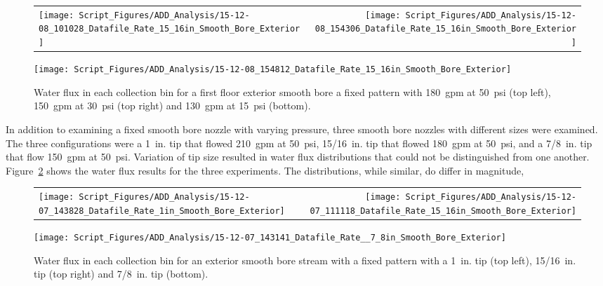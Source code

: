 \documentclass[12pt,oneside]{book}
\begin{document}
\begin{figure}[ht]
\begin{tabular*}{\textwidth}{lr}
\texttt{[image: Script\_Figures/ADD\_Analysis/15-12-08\_101028\_Datafile\_Rate\_15\_16in\_Smooth\_Bore\_Exterior]} &
\texttt{[image: Script\_Figures/ADD\_Analysis/15-12-08\_154306\_Datafile\_Rate\_15\_16in\_Smooth\_Bore\_Exterior]} \\
\end{tabular*}
\centering
\texttt{[image: Script\_Figures/ADD\_Analysis/15-12-08\_154812\_Datafile\_Rate\_15\_16in\_Smooth\_Bore\_Exterior]}
\caption[Water Flux Varying Pressure with Smooth Bore Stream]{Water flux in each collection bin for a first floor exterior smooth bore a fixed pattern with 180~gpm at 50~psi (top left), 150~gpm at 30~psi (top right) and 130~gpm at 15~psi (bottom).}
\label{fig:Exterior_First_Floor_Varying_Nozzle_Pressure_SB_Fixed_Pattern}
\end{figure}

\clearpage

In addition to examining a fixed smooth bore nozzle with varying pressure, three smooth bore nozzles with different sizes were examined. The three configurations were a 1~in. tip that flowed 210~gpm at 50~psi, 15/16~in. tip that flowed 180~gpm at 50~psi, and a 7/8~in. tip that flow 150~gpm at 50~psi. Variation of tip size resulted in water flux distributions that could not be distinguished from one another. Figure~\ref{fig:Exterior_Second_Floor_Varying_Flow_Rates_SB_Fixed_Pattern} shows the water flux results for the three experiments. The distributions, while similar, do differ in magnitude,

\begin{figure}[ht]
\begin{tabular*}{\textwidth}{lr}
\texttt{[image: Script\_Figures/ADD\_Analysis/15-12-07\_143828\_Datafile\_Rate\_1in\_Smooth\_Bore\_Exterior]} &
\texttt{[image: Script\_Figures/ADD\_Analysis/15-12-07\_111118\_Datafile\_Rate\_15\_16in\_Smooth\_Bore\_Exterior]} \\
\end{tabular*}
\centering
\texttt{[image: Script\_Figures/ADD\_Analysis/15-12-07\_143141\_Datafile\_Rate\_\_7\_8in\_Smooth\_Bore\_Exterior]}
\caption[Water Flux Varying Tip Size for Smooth Bore Nozzle]{Water flux in each collection bin for an exterior smooth bore stream with a fixed pattern with a 1~in. tip (top left), 15/16~in. tip (top right) and 7/8~in. tip (bottom).}
\label{fig:Exterior_Second_Floor_Varying_Flow_Rates_SB_Fixed_Pattern}
\end{figure}
\end{document}
